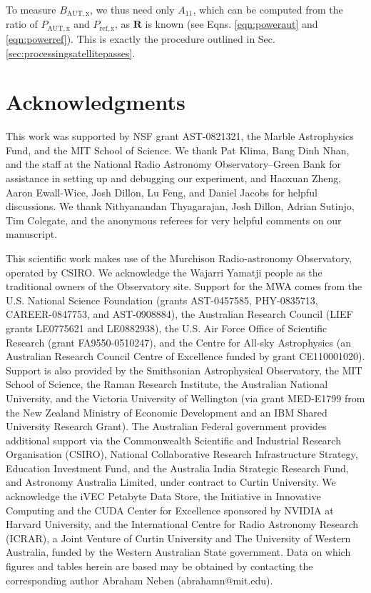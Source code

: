 To measure $B_\mathrm{AUT,x}$, we thus need only $A_{11}$, which can be computed from the ratio of $P_\mathrm{AUT,x}$ and $P_\mathrm{ref,x}$, as $\textbf{R}$ is known (see Eqns. \ref{eqn:poweraut} and \ref{eqn:powerref}). This is exactly the procedure outlined in Sec. \ref{sec:processingsatellitepasses}.  

\section{Acknowledgments}
This work was supported by NSF grant AST-0821321, the Marble Astrophysics Fund, and the MIT School of Science. We thank Pat Klima, Bang Dinh Nhan, and the staff at the National Radio Astronomy Observatory--Green Bank for assistance in setting up and debugging our experiment, and Haoxuan Zheng, Aaron Ewall-Wice, Josh Dillon, Lu Feng, and Daniel Jacobs for helpful discussions. We thank Nithyanandan Thyagarajan, Josh Dillon, Adrian Sutinjo, Tim Colegate, and the anonymous referees for very helpful comments on our manuscript.

This scientific work makes use of the Murchison Radio-astronomy Observatory, operated by CSIRO. We acknowledge the Wajarri Yamatji people as the traditional owners of the Observatory site. Support for the MWA comes from the U.S. National Science Foundation (grants AST-0457585, PHY-0835713, CAREER-0847753, and AST-0908884), the Australian Research Council (LIEF grants LE0775621 and LE0882938), the U.S. Air Force Office of Scientific Research (grant FA9550-0510247), and the Centre for All-sky Astrophysics (an Australian Research Council Centre of Excellence funded by grant CE110001020). Support is also provided by the Smithsonian Astrophysical Observatory, the MIT School of Science, the Raman Research Institute, the Australian National University, and the Victoria University of Wellington (via grant MED-E1799 from the New Zealand Ministry of Economic Development and an IBM Shared University Research Grant). The Australian Federal government provides additional support via the Commonwealth Scientific and Industrial Research Organisation (CSIRO), National Collaborative Research Infrastructure Strategy, Education Investment Fund, and the Australia India Strategic Research Fund, and Astronomy Australia Limited, under contract to Curtin University. We acknowledge the iVEC Petabyte Data Store, the Initiative in Innovative Computing and the CUDA Center for Excellence sponsored by NVIDIA at Harvard University, and the International Centre for Radio Astronomy Research (ICRAR), a Joint Venture of Curtin University and The University of Western Australia, funded by the Western Australian State government. Data on which figures and tables herein are based may be obtained by contacting the corresponding author Abraham Neben (abrahamn@mit.edu).


